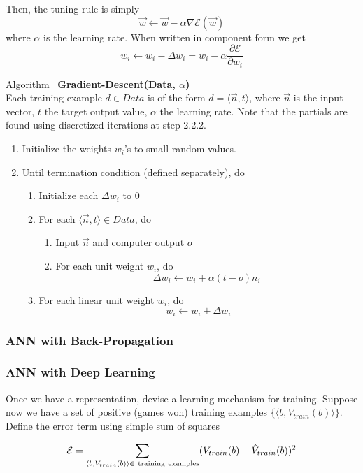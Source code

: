 \documentclass[12pt]{article}  %
\newcommand{\algtitle}[1]{\underline{Algorithm \ {\bf #1}} \vspace*{1mm}\\}
\begin{document}
Then, the tuning rule is simply $$\vec{w} \leftarrow \vec{w} - \alpha \nabla \mathcal{E}(\vec{w})$$ where $\alpha$ is the learning rate. When written in component form we get $$w_i \leftarrow w_i - \Delta w_i = w_i - \alpha \frac{\partial \mathcal{E}}{\partial w_i}$$


\algtitle{Gradient-Descent(Data, $\alpha$)}
Each training example $d \in Data$ is of the form $d = \langle \vec{n}, t \rangle$, where $\vec{n}$ is the input vector, $t$ the target output value, $\alpha$ the learning rate. Note that the partials are found using discretized iterations at step 2.2.2.

\begin{enumerate}
	\item Initialize the weights $w_i$'s to small random values.
	\item Until termination condition (defined separately), do
		\begin{enumerate}
			\item Initialize each $\Delta w_i$ to 0
			\item For each $\langle \vec{n}, t \rangle \in Data$, do 
			\begin{enumerate}
				\item Input $\vec{n}$ and computer output $o$
				\item For each unit weight $w_i$, do $$\Delta w_i \leftarrow w_i + \alpha(t-o)n_i$$
			\end{enumerate}
			\item For each linear unit weight $w_i$, do $$w_i \leftarrow w_i + \Delta w_i$$
		\end{enumerate}
\end{enumerate}


\subsubsection{ANN with Back-Propagation}
\subsubsection{ANN with Deep Learning}

Once we have a representation, devise a learning mechanism for training. Suppose now we have a set of positive (games won) training examples $\{\langle b, V_{train}(b) \rangle\}$. Define the error term using simple sum of squares

$$\mathcal{E} = \sum_{\langle b, V_{train}(b) \rangle \in \ {\rm training\ examples}} (V_{train}(b) - \hat{V}_{train}(b))^2$$
\end{document}
